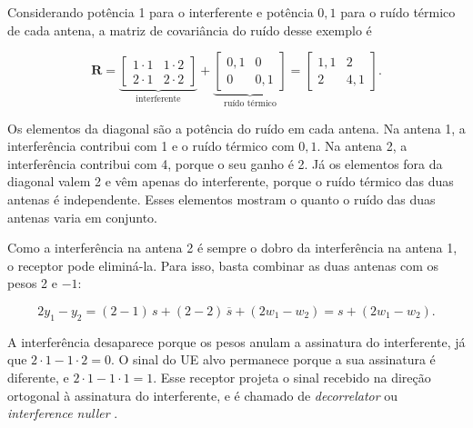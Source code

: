 Considerando potência 1 para o interferente e potência $0{,}1$ para o ruído térmico de cada antena, a matriz de covariância do ruído desse exemplo é

$$
\mathbf{R}=
\underbrace{\begin{bmatrix} 1\cdot 1 & 1\cdot 2 \\ 2\cdot 1 & 2\cdot 2 \end{bmatrix}}_{\text{interferente}}
+
\underbrace{\begin{bmatrix} 0{,}1 & 0 \\ 0 & 0{,}1 \end{bmatrix}}_{\text{ruído térmico}}
=
\begin{bmatrix} 1{,}1 & 2 \\ 2 & 4{,}1 \end{bmatrix}.
$$

Os elementos da diagonal são a potência do ruído em cada antena. Na antena 1, a interferência contribui com 1 e o ruído térmico com $0{,}1$. Na antena 2, a interferência contribui com 4, porque o seu ganho é 2. Já os elementos fora da diagonal valem 2 e vêm apenas do interferente, porque o ruído térmico das duas antenas é independente. Esses elementos mostram o quanto o ruído das duas antenas varia em conjunto.



Como a interferência na antena 2 é sempre o dobro da interferência na antena 1, o receptor pode eliminá-la. Para isso, basta combinar as duas antenas com os pesos 2 e $-1$:

$$
2y_1 - y_2 = (2-1)\,s + (2-2)\,\overline{s} + (2w_1 - w_2) = s + (2w_1 - w_2).
$$

A interferência desaparece porque os pesos anulam a assinatura do interferente, já que $2\cdot 1 - 1\cdot 2 = 0$. O sinal do UE alvo permanece porque a sua assinatura é diferente, e $2\cdot 1 - 1\cdot 1 = 1$. Esse receptor projeta o sinal recebido na direção ortogonal à assinatura do interferente, e é chamado de \textit{decorrelator} ou \textit{interference nuller} \cite[p.~81--82]{tse-viswanath}.


